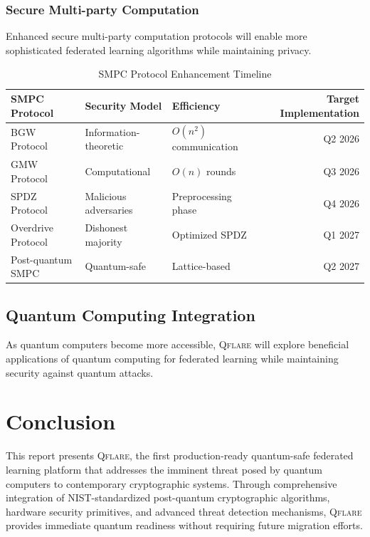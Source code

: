 \documentclass[12pt,a4paper,twoside]{book}
\newcommand{\qflare}{\textsc{Qflare}}
\begin{document}
\subsection{Secure Multi-party Computation}
\label{subsec:smpc}

Enhanced secure multi-party computation protocols will enable more sophisticated federated learning algorithms while maintaining privacy.

\begin{table}[htbp]
\centering
\caption{SMPC Protocol Enhancement Timeline}
\label{tab:smpc-roadmap}
\begin{tabular}{@{}lllr@{}}
\toprule
\textbf{SMPC Protocol} & \textbf{Security Model} & \textbf{Efficiency} & \textbf{Target Implementation} \\
\midrule
BGW Protocol & Information-theoretic & $O(n^2)$ communication & Q2 2026 \\
GMW Protocol & Computational & $O(n)$ rounds & Q3 2026 \\
SPDZ Protocol & Malicious adversaries & Preprocessing phase & Q4 2026 \\
Overdrive Protocol & Dishonest majority & Optimized SPDZ & Q1 2027 \\
Post-quantum SMPC & Quantum-safe & Lattice-based & Q2 2027 \\
\bottomrule
\end{tabular}
\end{table}

\section{Quantum Computing Integration}
\label{sec:quantum-integration}

As quantum computers become more accessible, \qflare{} will explore beneficial applications of quantum computing for federated learning while maintaining security against quantum attacks.

\chapter{Conclusion}
\label{ch:conclusion}

This report presents \qflare{}, the first production-ready quantum-safe federated learning platform that addresses the imminent threat posed by quantum computers to contemporary cryptographic systems. Through comprehensive integration of NIST-standardized post-quantum cryptographic algorithms, hardware security primitives, and advanced threat detection mechanisms, \qflare{} provides immediate quantum readiness without requiring future migration efforts.
\end{document}
